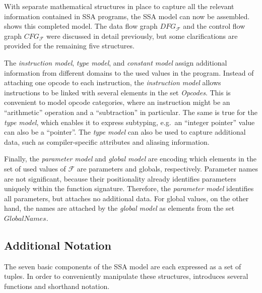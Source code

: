 \begin{figure}[p]
    
\end{figure}

    With separate mathematical structures in place to capture all the relevant
    information contained in SSA programs, the SSA model can now be assembled.
     shows this completed model.
    The data flow graph $DFG_\mathcal F$ and the control flow graph
    $CFG_\mathcal F$ were discussed in detail previously, but some
    clarifications are provided for the remaining five structures.

    The {\it instruction model}, {\it type model}, and {\it constant model}
    assign additional information from different domains to the used values in
    the program.
    Instead of attaching one opcode to each instruction, the
    {\it instruction model} allows instructions to be linked with several
    elements in the set {\it Opcodes}.
    This is convenient to model opcode categories, where an instruction might be
    an ``arithmetic'' operation and a ``subtraction'' in particular.
    The same is true for the {\it type model}, which enables it to express
    subtyping, e.g.\ an ``integer pointer'' value can also be a ``pointer''.
    The {\it type model} can also be used to capture additional data, such as
    compiler-specific attributes and aliasing information.
    
    Finally, the {\it parameter model} and {\it global model} are encoding which
    elements in the set of used values of $\mathcal F$ are parameters and
    globals, respectively.
    Parameter names are not significant, because their positionality
    already identifies parameters uniquely within the function signature.
    Therefore, the {\it parameter model} identifies all parameters, but attaches
    no additional data.
    For global values, on the other hand, the names are attached by the
    {\it global model} as elements from the set $GlobalNames$.

\subsection{Additional Notation}

    The seven basic components of the SSA model are each expressed as a set of
    tuples.
    In order to conveniently manipulate these structures, 
     introduces several functions and shorthand notation.

